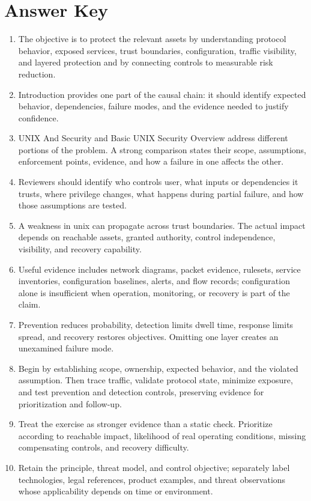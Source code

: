 \documentclass[11pt]{article}
\begin{document}
\section*{Answer Key}
\begin{enumerate}
\item The objective is to protect the relevant assets by understanding protocol behavior, exposed services, trust boundaries, configuration, traffic visibility, and layered protection and by connecting controls to measurable risk reduction.
\item Introduction provides one part of the causal chain: it should identify expected behavior, dependencies, failure modes, and the evidence needed to justify confidence.
\item UNIX And Security and Basic UNIX Security Overview address different portions of the problem. A strong comparison states their scope, assumptions, enforcement points, evidence, and how a failure in one affects the other.
\item Reviewers should identify who controls user, what inputs or dependencies it trusts, where privilege changes, what happens during partial failure, and how those assumptions are tested.
\item A weakness in unix can propagate across trust boundaries. The actual impact depends on reachable assets, granted authority, control independence, visibility, and recovery capability.
\item Useful evidence includes network diagrams, packet evidence, rulesets, service inventories, configuration baselines, alerts, and flow records; configuration alone is insufficient when operation, monitoring, or recovery is part of the claim.
\item Prevention reduces probability, detection limits dwell time, response limits spread, and recovery restores objectives. Omitting one layer creates an unexamined failure mode.
\item Begin by establishing scope, ownership, expected behavior, and the violated assumption. Then trace traffic, validate protocol state, minimize exposure, and test prevention and detection controls, preserving evidence for prioritization and follow-up.
\item Treat the exercise as stronger evidence than a static check. Prioritize according to reachable impact, likelihood of real operating conditions, missing compensating controls, and recovery difficulty.
\item Retain the principle, threat model, and control objective; separately label technologies, legal references, product examples, and threat observations whose applicability depends on time or environment.
\end{enumerate}
\end{document}
